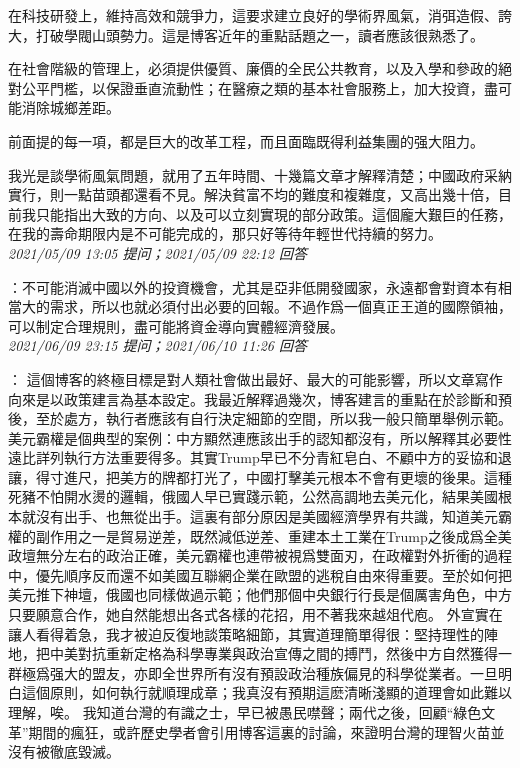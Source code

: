 \documentclass[twocolumn]{ctexart}
\begin{document}
在科技研發上，維持高效和競爭力，這要求建立良好的學術界風氣，消弭造假、誇大，打破學閥山頭勢力。這是博客近年的重點話題之一，讀者應該很熟悉了。

在社會階級的管理上，必須提供優質、廉價的全民公共教育，以及入學和參政的絕對公平門檻，以保證垂直流動性；在醫療之類的基本社會服務上，加大投資，盡可能消除城鄉差距。

前面提的每一項，都是巨大的改革工程，而且面臨既得利益集團的强大阻力。

我光是談學術風氣問題，就用了五年時間、十幾篇文章才解釋清楚；中國政府采納實行，則一點苗頭都還看不見。解決貧富不均的難度和複雜度，又高出幾十倍，目前我只能指出大致的方向、以及可以立刻實現的部分政策。這個龐大艱巨的任務，在我的壽命期限内是不可能完成的，那只好等待年輕世代持續的努力。
\\

\textit{\hfill\noindent\small 2021/05/09 13:05 提问；2021/05/09 22:12 回答}

：不可能消滅中國以外的投資機會，尤其是亞非低開發國家，永遠都會對資本有相當大的需求，所以也就必須付出必要的回報。不過作爲一個真正王道的國際領袖，可以制定合理規則，盡可能將資金導向實體經濟發展。
\\

\textit{\hfill\noindent\small 2021/06/09 23:15 提问；2021/06/10 11:26 回答}

：
這個博客的終極目標是對人類社會做出最好、最大的可能影響，所以文章寫作向來是以政策建言為基本設定。我最近解釋過幾次，博客建言的重點在於診斷和預後，至於處方，執行者應該有自行決定細節的空間，所以我一般只簡單舉例示範。
美元霸權是個典型的案例：中方顯然連應該出手的認知都沒有，所以解釋其必要性遠比詳列執行方法重要得多。其實Trump早已不分青紅皂白、不顧中方的妥協和退讓，得寸進尺，把美方的牌都打光了，中國打擊美元根本不會有更壞的後果。這種死豬不怕開水燙的邏輯，俄國人早已實踐示範，公然高調地去美元化，結果美國根本就沒有出手、也無從出手。這裏有部分原因是美國經濟學界有共識，知道美元霸權的副作用之一是貿易逆差，既然減低逆差、重建本土工業在Trump之後成爲全美政壇無分左右的政治正確，美元霸權也連帶被視爲雙面刃，在政權對外折衝的過程中，優先順序反而還不如美國互聯網企業在歐盟的逃稅自由來得重要。至於如何把美元推下神壇，俄國也同樣做過示範；他們那個中央銀行行長是個厲害角色，中方只要願意合作，她自然能想出各式各樣的花招，用不著我來越俎代庖。
外宣實在讓人看得着急，我才被迫反復地談策略細節，其實道理簡單得很：堅持理性的陣地，把中美對抗重新定格為科學專業與政治宣傳之間的搏鬥，然後中方自然獲得一群極爲强大的盟友，亦即全世界所有沒有預設政治種族偏見的科學從業者。一旦明白這個原則，如何執行就順理成章；我真沒有預期這麽清晰淺顯的道理會如此難以理解，唉。
我知道台灣的有識之士，早已被愚民噤聲；兩代之後，回顧“綠色文革”期間的瘋狂，或許歷史學者會引用博客這裏的討論，來證明台灣的理智火苗並沒有被徹底毀滅。
\\
\end{document}
